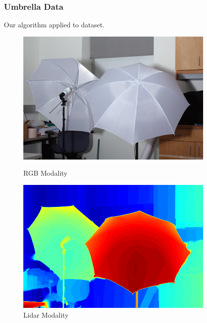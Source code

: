 \documentclass{beamer}
\begin{document}
\begin{frame}
  \frametitle{Umbrella Data}
  Our algorithm applied to \cite{Scharstein2014} dataset.
  \begin{figure}[ht]
    \begin{minipage}[b]{0.45\linewidth}
      \centering
      \includegraphics[width=\textwidth]{./Images/Umbrella/optical.png}
      \caption{RGB Modality}
    \end{minipage}
    \begin{minipage}[b]{0.45\linewidth}
      \centering
      \includegraphics[width=\textwidth]{./Images/Umbrella/lidarColor.png}
      \caption{Lidar Modality}
    \end{minipage}
  \end{figure}
\end{frame}

\end{document}
